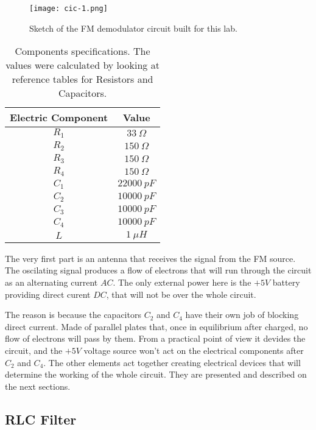 \documentclass{article}
\begin{document}
\begin{figure}[H]
\center
\texttt{[image: cic-1.png]}
\caption {Sketch of the FM demodulator circuit built for this lab.} 
\label{Fig:3}
\end{figure}

\begin{table}[H]
\center
\begin{tabular}{|c|c|}
\hline
Electric Component    &   Value    \\ 
\hline
$R_{1}$ & $33 \ \Omega$ \\ 
\hline
$R_{2}$ & $150 \ \Omega$ \\ 
\hline
$R_{3}$ & $150 \ \Omega$ \\ 
\hline
$R_{4}$ & $150 \ \Omega$ \\ 
\hline
$C_{1}$ & $22000 \ pF$ \\ 
\hline
$C_{2}$ & $10000 \ pF$ \\ 
\hline
$C_{3}$ & $10000 \ pF$ \\ 
\hline
$C_{4}$ & $10000 \ pF$ \\ 
\hline
$L$ & $1 \ \mu H$ \\ 
\hline
\end{tabular}
\caption{Components specifications. The values were calculated by looking at reference tables for Resistors and Capacitors.} 
\label{tab:1}
\end{table}

The very first part is an antenna that receives the signal from the FM source.
The oscilating signal produces a flow of electrons that will run through the circuit 
as an alternating current $AC$. The only external power here is the $+5V$ battery providing 
direct curent $DC$, that will not be over the whole circuit. 

The reason is because the capacitors $C_{2}$ and $C_{4}$ have their own job of blocking direct
current. Made of parallel plates that, once in equilibrium after
charged, no flow of electrons will pass by them. 
From a practical point of view it devides the circuit, and the
$+5V$ voltage source won't act on the electrical components after
$C_{2}$ and $C_{4}$. The other elements act together creating electrical
devices that will determine the working of the whole circuit. They are
presented and described on the next sections.

\subsection{RLC Filter}
\end{document}
